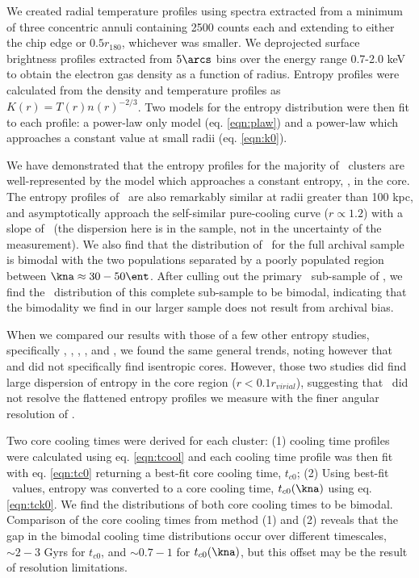 \documentclass{emulateapj}
\begin{document}
We created radial temperature profiles using spectra extracted from a
minimum of three concentric annuli containing 2500 counts each and
extending to either the chip edge or $0.5 r_{180}$, whichever was
smaller. We deprojected surface brightness profiles extracted from
$5\arcs$ bins over the energy range 0.7-2.0 keV to obtain the electron
gas density as a function of radius. Entropy profiles were calculated
from the density and temperature profiles as $K(r) =
T(r)n(r)^{-2/3}$. Two models for the entropy distribution were then
fit to each profile: a power-law only model (eq. \ref{eqn:plaw}) and
a power-law which approaches a constant value at small radii
(eq. \ref{eqn:k0}).

We have demonstrated that the entropy profiles for the majority of
\accept\ clusters are well-represented by the model which approaches a
constant entropy, \kna, in the core. The entropy profiles of
\accept\ are also remarkably similar at radii greater than 100 kpc,
and asymptotically approach the self-similar pure-cooling curve ($r
\propto 1.2$) with a slope of \alphafs\ (the dispersion here is in the
sample, not in the uncertainty of the measurement). We also find that
the distribution of \kna\ for the full archival sample is bimodal with
the two populations separated by a poorly populated region between
$\kna \approx 30-50 \ent$. After culling out the primary
\hifl\ sub-sample of \citet{hiflugcs1}, we find the \kna\ distribution
of this complete sub-sample to be bimodal, indicating that the
bimodality we find in our larger sample does not result from archival
bias.

When we compared our results with those of a few other entropy
studies, specifically \citet{davies00}, \citet{ponman03},
\citet{piffaretti05}, \citet{pratt06}, and \citet{morandi07}, we found
the same general trends, noting however that \citet{piffaretti05} and
\citet{pratt06} did not specifically find isentropic cores. However,
those two studies did find large dispersion of entropy in the core
region ($r < 0.1 r_{virial}$), suggesting that \xmm\ did not resolve
the flattened entropy profiles we measure with the finer angular
resolution of \chandra.

Two core cooling times were derived for each cluster: (1) cooling time
profiles were calculated using eq. \ref{eqn:tcool} and each cooling
time profile was then fit with eq. \ref{eqn:tc0} returning a best-fit
core cooling time, $t_{c0}$; (2) Using best-fit \kna\ values, entropy
was converted to a core cooling time, $t_{c0}(\kna)$ using
eq. \ref{eqn:tck0}. We find the distributions of both core cooling
times to be bimodal. Comparison of the core cooling times from method
(1) and (2) reveals that the gap in the bimodal cooling time
distributions occur over different timescales, $\sim 2-3$ Gyrs for
$t_{c0}$, and $\sim 0.7-1$ for $t_{c0}(\kna)$, but this offset may be
the result of resolution limitations.
\end{document}
